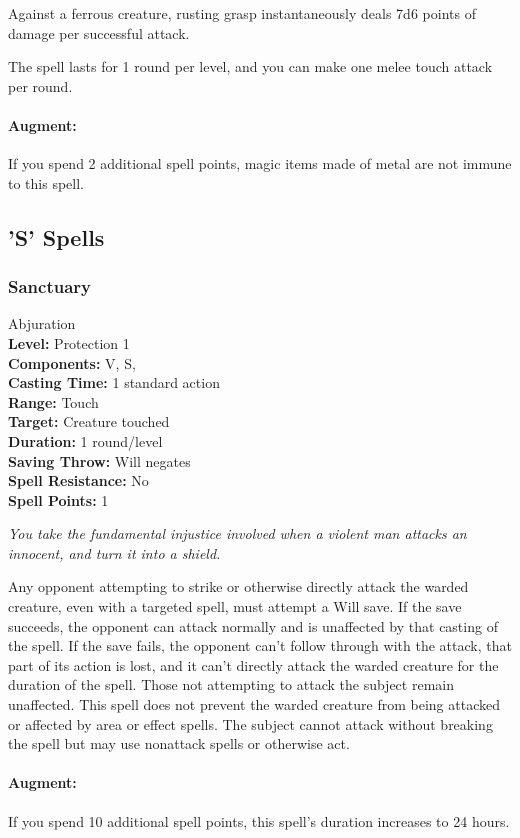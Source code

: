 Against a ferrous creature, rusting grasp instantaneously deals 7d6 points of damage per successful attack. 

The spell lasts for 1 round per level, and you can make one melee touch attack per round.

\paragraph{Augment:} If you spend 2 additional spell points, magic items made of metal are not immune to this spell.
\subsection{'S' Spells}
\subsubsection{Sanctuary}
\label{Spell:Sanctuary}
Abjuration
\\ \textbf{Level:} Protection 1
\\ \textbf{Components:} V, S,
\\ \textbf{Casting Time:} 1 standard action
\\ \textbf{Range:} Touch
\\ \textbf{Target:} Creature touched
\\ \textbf{Duration:} 1 round/level
\\ \textbf{Saving Throw:} Will negates
\\ \textbf{Spell Resistance:} No
\\ \textbf{Spell Points:} 1

\emph{You take the fundamental injustice involved when a violent man attacks an innocent, and turn it into a shield.}

Any opponent attempting to strike or otherwise directly attack the warded creature, even with a targeted spell, must attempt a Will save. 
If the save succeeds, the opponent can attack normally and is unaffected by that casting of the spell. 
If the save fails, the opponent can't follow through with the attack, that part of its action is lost, and it can't directly attack the warded creature for the duration of the spell. 
Those not attempting to attack the subject remain unaffected. 
This spell does not prevent the warded creature from being attacked or affected by area or effect spells. 
The subject cannot attack without breaking the spell but may use nonattack spells or otherwise act.

\paragraph{Augment:} If you spend 10 additional spell points, this spell's duration increases to 24 hours.
